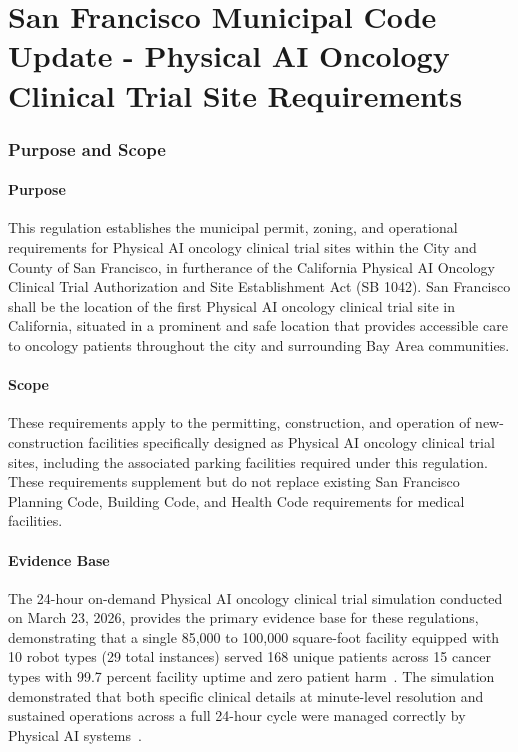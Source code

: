 

\part{San Francisco Municipal Code Update - Physical AI Oncology Clinical Trial Site Requirements}
\setcounter{section}{0}

\section{Purpose and Scope}

\subsection{Purpose}

This regulation establishes the municipal permit, zoning, and operational
requirements for Physical AI oncology clinical trial sites within the City and
County of San Francisco, in furtherance of the California Physical AI Oncology
Clinical Trial Authorization and Site Establishment Act (SB 1042). San
Francisco shall be the location of the first Physical AI oncology clinical trial
site in California, situated in a prominent and safe location that provides
accessible care to oncology patients throughout the city and surrounding Bay
Area communities.

\subsection{Scope}

These requirements apply to the permitting, construction, and operation of
new-construction facilities specifically designed as Physical AI oncology
clinical trial sites, including the associated parking facilities required under
this regulation. These requirements supplement but do not replace existing San
Francisco Planning Code, Building Code, and Health Code requirements for medical
facilities.

\subsection{Evidence Base}

The 24-hour on-demand Physical AI oncology clinical trial simulation conducted
on March 23, 2026, provides the primary evidence base for these regulations,
demonstrating that a single 85,000 to 100,000 square-foot facility equipped
with 10 robot types (29 total instances) served 168 unique patients across 15
cancer types with 99.7 percent facility uptime and zero patient
harm~\cite{newtrial2026}. The simulation demonstrated that both specific
clinical details at minute-level resolution and sustained operations across a
full 24-hour cycle were managed correctly by Physical AI
systems~\cite{newtrial2026}.

